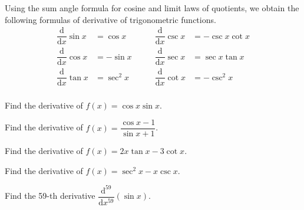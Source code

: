Using the sum angle formula for cosine and limit laws of quotients, we
obtain the following formulas of derivative of trigonometric functions.
\[
\begin{aligned}
\dfrac{\mathrm{d}}{\mathrm{d} x}\sin x &= \cos x \\
\dfrac{\mathrm{d}}{\mathrm{d} x}\cos x &= -\sin x\\
\dfrac{\mathrm{d}}{\mathrm{d} x}\tan x &= \sec^2x\\
\end{aligned}
\qquad
\begin{aligned}
\dfrac{\mathrm{d}}{\mathrm{d} x}\csc x &= -\csc x \cot x \\
\dfrac{\mathrm{d}}{\mathrm{d} x}\sec x &= \sec x\tan x\\
\dfrac{\mathrm{d}}{\mathrm{d} x}\cot x &= -\csc^2x\\
\end{aligned}
\]

\begin{example}

Find the derivative of \(f(x)=\cos x\sin x\).

\end{example}
\vspace*{6\baselineskip}

\begin{example}

Find the derivative of \(f(x)=\dfrac{\cos x-1}{\sin x+1}\).

\end{example}
\vspace*{6\baselineskip}

\begin{example}

Find the derivative of \(f(x)=2x\tan x-3\cot x\).

\end{example}
\vspace*{6\baselineskip}

\begin{example}

Find the derivative of \(f(x)=\sec^2x-x\csc x\).

\end{example}
\vspace*{6\baselineskip}

\begin{example}

Find the 59-th derivative
\(\dfrac{\mathrm{d}^{59}}{\mathrm{d}x^{59}}(\sin x)\).

\end{example}
\vspace*{6\baselineskip}

